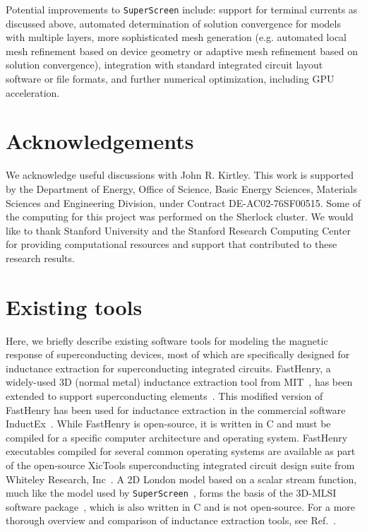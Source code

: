\documentclass[final,3p,times,twocolumn]{elsarticle}
\newcommand{\inline}[1]{\texttt{#1}\xspace}
\newcommand{\SuperScreen}{\inline{SuperScreen}}
\begin{document}
Potential improvements to \SuperScreen include: support for terminal currents as discussed above, automated determination of solution convergence for models with multiple layers, more sophisticated mesh generation (e.g. automated local mesh refinement based on device geometry or adaptive mesh refinement based on solution convergence), integration with standard integrated circuit layout software or file formats, and further numerical optimization, including GPU acceleration.

\section{Acknowledgements}
\label{section:acknowledgements}
We acknowledge useful discussions with John R. Kirtley. This work is supported by the Department of Energy,  Office of Science, Basic Energy Sciences, Materials Sciences and Engineering Division, under Contract DE-AC02-76SF00515. Some of the computing for this project was performed on the Sherlock cluster. We would like to thank Stanford University and the Stanford Research Computing Center for providing computational resources and support that contributed to these research results.




\appendix

\section{Existing tools}
\label{appendix:other-tools}

Here, we briefly describe existing software tools for modeling the magnetic response of superconducting devices, most of which are specifically designed for inductance extraction for superconducting integrated circuits. FastHenry, a widely-used 3D (normal metal) inductance extraction tool from MIT~\cite{Kamon1994-ck}, has been extended to support superconducting elements~\cite{wrcad, XicTools}. This modified version of FastHenry has been used for inductance extraction in the commercial software InductEx~\cite{Fourie2011-wl}. While FastHenry is open-source, it is written in C and must be compiled for a specific computer architecture and operating system. FastHenry executables compiled for several common operating systems are available as part of the open-source XicTools superconducting integrated circuit design suite from Whiteley Research, Inc~\cite{wrcad, XicTools}. A 2D London model based on a scalar stream function, much like the model used by \SuperScreen~\cite{Brandt2004-ew, Brandt2005-wj}, forms the basis of the 3D-MLSI software package~\cite{Khapaev1997-kw, Khapaev2001-xq, Khapaev2001-pw}, which is also written in C and is not open-source. For a more thorough overview and comparison of inductance extraction tools, see Ref.~\cite{Gaj1999-ls}.
\end{document}
